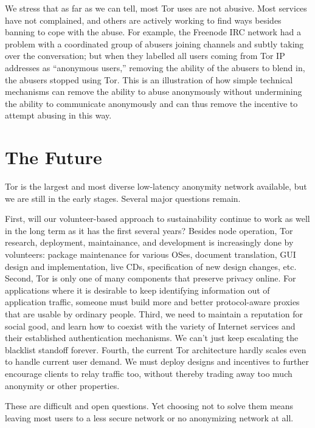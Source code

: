 \documentclass{llncs}
\begin{document}
We stress that as far as we can tell, most Tor uses are not
abusive. Most services have not complained, and others are actively
working to find ways besides banning to cope with the abuse. For
example, the Freenode IRC network had a problem with a coordinated
group of abusers joining channels and subtly taking over the
conversation; but when they labelled all users coming from Tor IP
addresses as ``anonymous users,'' removing the ability of the abusers
to blend in, the abusers stopped using Tor.  This is an illustration of
how simple
technical mechanisms can remove the ability to abuse anonymously
without undermining the ability to communicate anonymously and can
thus remove the incentive to attempt abusing in this way.



\section{The Future}
\label{sec:conclusion}

Tor is the largest and most diverse low-latency anonymity network
available, but we are still in the early stages. Several major
questions remain.

First, will our volunteer-based approach to sustainability continue to
work as well in the long term as it has the first several years?
Besides node operation, Tor research, deployment, maintainance, and
development is increasingly done by volunteers: package maintenance
for various OSes, document translation, GUI design and implementation,
live CDs, specification of new design changes, etc.\
%
Second, Tor is only one of many components that preserve privacy
online.  For applications where it is desirable to keep identifying
information out of application traffic, someone must build more and
better protocol-aware proxies that are usable by ordinary people.
%
Third, we need to maintain a reputation for social good, and learn how to
coexist with the variety of Internet services and their established
authentication mechanisms. We can't just keep escalating the blacklist
standoff forever.
%
Fourth, the current Tor architecture hardly scales even to handle
current user demand. We must deploy designs and incentives to further
encourage clients to relay traffic too, without thereby trading away
too much anonymity or other properties.

These are difficult and open questions. Yet choosing not to solve them
means leaving most users to a less secure network or no anonymizing
network at all.

 
\end{document}
